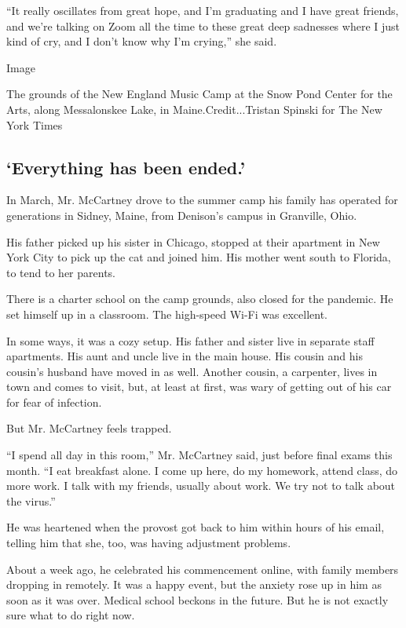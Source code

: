 ``It really oscillates from great hope, and I'm graduating and I have
great friends, and we're talking on Zoom all the time to these great
deep sadnesses where I just kind of cry, and I don't know why I'm
crying,'' she said.

Image

The grounds of the New England Music Camp at the Snow Pond Center for
the Arts, along Messalonskee Lake, in Maine.Credit...Tristan Spinski for
The New York Times

\hypertarget{everything-has-been-ended}{%
\subsection{`Everything has been
ended.'}\label{everything-has-been-ended}}

In March, Mr. McCartney drove to the summer camp his family has operated
for generations in Sidney, Maine, from Denison's campus in Granville,
Ohio.

His father picked up his sister in Chicago, stopped at their apartment
in New York City to pick up the cat and joined him. His mother went
south to Florida, to tend to her parents.

There is a charter school on the camp grounds, also closed for the
pandemic. He set himself up in a classroom. The high-speed Wi-Fi was
excellent.

In some ways, it was a cozy setup. His father and sister live in
separate staff apartments. His aunt and uncle live in the main house.
His cousin and his cousin's husband have moved in as well. Another
cousin, a carpenter, lives in town and comes to visit, but, at least at
first, was wary of getting out of his car for fear of infection.

But Mr. McCartney feels trapped.

``I spend all day in this room,'' Mr. McCartney said, just before final
exams this month. ``I eat breakfast alone. I come up here, do my
homework, attend class, do more work. I talk with my friends, usually
about work. We try not to talk about the virus.''

He was heartened when the provost got back to him within hours of his
email, telling him that she, too, was having adjustment problems.

About a week ago, he celebrated his commencement online, with family
members dropping in remotely. It was a happy event, but the anxiety rose
up in him as soon as it was over. Medical school beckons in the future.
But he is not exactly sure what to do right now.

